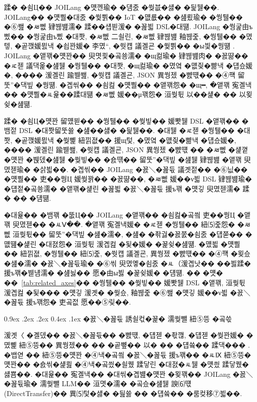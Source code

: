 \documentclass[10pt,twocolumn]{article}
\makeatletter
\renewcommand{\subsection}{\@startsection{subsection}{2}{\z@}%
{0.9ex \@plus .2ex \@minus .2ex}%
{0.4ex \@plus .1ex}%
{\normalfont\normalsize\bfseries}}
\makeatother
\begin{document}
蹂� �쇰Ц�� JOILang �먯껜瑜� �덈줈 �쒖븞�섏� �딅뒗��. JOILang�� �먯뿰�대줈 �쒗쁽�� IoT �먮룞�� �섎룄瑜� �쒕퉬�� �⑥쐞 �ㅽ뻾 肄붾뱶濡� 蹂��섑븯湲� �꾪븳 DSL�대떎. JOILang �쒕굹由ъ삤�� �쒕굹由ъ삤 �대쫫, �ㅽ뻾 二쇨린, �ㅽ뻾 肄붾뱶 釉붾줉, �쒕퉬�� �몄텧, �곹깭媛믨낵 �쇱꽌媛� 李몄“, �쒓컙 議곌굔 �쒗쁽�� �ы븿�쒕떎 \cite{REF_JOILANG_PIPELINE}. JOILang �앹꽦�먯꽌�� 臾몃쾿�곸쑝濡� �щ컮瑜� 肄붾뱶肉� �꾨땲�� �ㅼ젣 議댁옱�섎뒗 �쒕퉬�� �대쫫, �щ컮瑜� �몄옄 �먮즺�뺢낵 �덉슜媛�, ���� 湲곌린 踰붿쐞, �쒓컙 議곌굔, JSON 異쒕젰 �뺤떇�� �④퍡 留뚯”�댁빞 �쒕떎. �곕씪�� �쇰컲 �먯뿰�� �앹꽦怨� �щ━, �앹꽦 寃곌낵�� �먯뿰�ㅻ윭��蹂대떎 �ㅽ뻾 媛��μ꽦怨� 洹쒖튃 以��섍� �� 以묒슂�섎떎.

蹂� �쇰Ц�먯꽌 留먰븯�� �쒕퉬�� �쒖빟�� 媛뽯뒗 DSL �앹꽦�� �뱀젙 DSL �대쫫留뚯쓣 �섎��섏� �딅뒗��. �대뒗 �ㅼ젣 �쒕퉬�� �대쫫, �곹깭媛믨낵 �쒖뼱 紐낅졊�� 援щ텇, �몄옄 �먮즺�뺢낵 �덉슜媛�, ���� 湲곌린 踰붿쐞, �쒓컙 議곌굔, JSON 異쒕젰 �뺤떇 �� �ㅽ뻾 �섍꼍�먯꽌 �붽뎄�섎뒗 �쒖빟�� �숈떆�� 留뚯”�댁빞 �섎뒗 肄붾뱶 �앹꽦 臾몄젣瑜� �삵븳��. �곕씪�� JOILang �꾨＼�꾪듃 議곗젙�� �⑥닚�� �먯뿰�� 吏��쒕Ц 媛쒖꽑�� �꾨땲��, �ㅽ뻾 媛��ν븳 DSL 肄붾뱶瑜� �덉젙�곸쑝濡� �앹꽦�섍린 �꾪븳 �꾨＼�꾪듃 援ъ꽦 �먯깋 臾몄젣濡� 蹂� �� �덈떎.

�대윭�� �뱀꽦 �뚮Ц�� JOILang �앹꽦�� �쇰컲�곸씤 吏��쒕Ц �앹꽦 臾몄젣�� �ㅻⅤ��. �앹꽦 寃곌낵媛� �ㅼ젣 �쒕퉬�� 紐⑸줉怨� �ㅽ뻾 洹쒖튃�� 留뚯”�댁빞 �섎�濡�, �섎� �좎궗�꾨쭔�쇰줈 �덉쭏�� �먮떒�섍린 �대졄怨� 洹쒖튃 湲곕컲 �됯�媛� �꾩슂�섎떎. �먰븳 �먯뿰�� 紐낅졊, �쒕퉬�� 紐⑸줉, �쒓컙 議곌굔, 異쒕젰 �뺤떇�� �④퍡 �묒슜�섎�濡� �꾨＼�꾪듃瑜� �⑥씪 臾몄옣�쇰줈 �ㅻ（湲곕낫�� ��븷蹂� 援ъ꽦�붿냼濡� �섎늻�� 愿�由ы븷 �꾩슂媛� �덈떎. �� �먯� ��~\ref{tab:related_axes}�� �쒕퉬�� �쒖빟�� 媛뽯뒗 DSL �앹꽦, 洹쒖튃 湲곕컲 �됯��� �먯깋 湲곗� �쒖슜, 釉붾줉 �⑥쐞 �먯깋 媛��ν븳 �꾨＼�꾪듃 援ъ꽦怨� 吏곸젒 愿��⑤맂��.

\subsection{�꾨＼�꾪듃 誘쇨컧�꾩� 濡쒖뺄 紐⑤뜽 �곸쓳}

湲곗〈 �곌뎄�� �꾨＼�꾪듃�� �뺤떇, �덉젣 �좏깮, �덉젣 �쒖꽌媛� �몄뼱 紐⑤뜽�� 異쒕젰�� �� �곹뼢�� 以� �� �덉쓬�� 蹂댁��� \cite{REF_ZHAO_CALIBRATE,REF_PROMPT_ORDER,REF_PROMPT_FORMAT_SENSITIVITY}. �뱁엳 �� 紐⑤뜽�먯꽌 �④낵�곸씤 �꾨＼�꾪듃 援ъ꽦�� �ㅻⅨ 紐⑤뜽�먯꽌�� �숈씪�섍쾶 �④낵�곸씠�쇨퀬 蹂닿린 �대졄�ㅻ뒗 �먯씠 蹂닿퀬�섏뿀��. �대윭�� 寃곌낵�� �대씪�곕뱶�먯꽌 �묒꽦�� JOILang �꾨＼�꾪듃瑜� 濡쒖뺄 LLM�� 洹몃�濡� �곸슜�섎뒗 諛⑹떇(DirectTransfer)�� 異⑸텇�섏� �딆쓣 �� �덉쓬�� �룸컺移⑦븳��.
\end{document}

